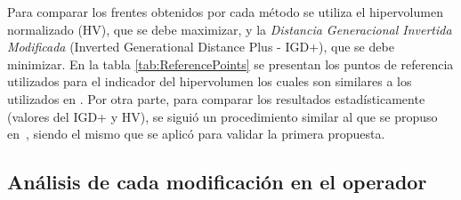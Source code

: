 Para comparar los frentes obtenidos por cada método se utiliza el hipervolumen normalizado (HV), 
que se debe maximizar, 
y la \textit{Distancia Generacional Invertida Modificada} (Inverted Generational Distance Plus - IGD+), que se
debe minimizar.
%
En la tabla \ref{tab:ReferencePoints} se presentan los puntos de referencia utilizados para el indicador del hipervolumen los cuales son similares 
a los utilizados en \cite{Joel:Kuhn_Munkres, Joel:OperatorAHX}.
%
Por otra parte, para comparar los resultados estadísticamente (valores del IGD+ y HV), se siguió un procedimiento similar al que se propuso en~\cite{Joel:StatisticalTest},
siendo el mismo que se aplicó para validar la primera propuesta.
%
%
%
%
%
%
%
%


\subsection{Análisis de cada modificación en el operador \SBX{}}

